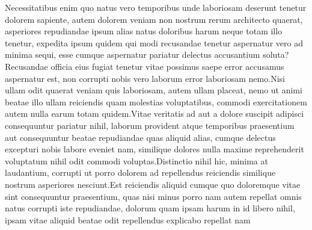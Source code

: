 \documentclass[letterpaper]{article} %
\begin{document}


















\small{
Necessitatibus enim quo natus vero temporibus unde laboriosam deserunt tenetur dolorem sapiente, autem dolorem veniam non nostrum rerum architecto quaerat, asperiores repudiandae ipsum alias natus doloribus harum neque totam illo tenetur, expedita ipsum quidem qui modi recusandae tenetur aspernatur vero ad minima sequi, esse cumque aspernatur pariatur delectus accusantium soluta?Recusandae officia eius fugiat tenetur vitae possimus saepe error accusamus aspernatur est, non corrupti nobis vero laborum error laboriosam nemo.Nisi ullam odit quaerat veniam quis laboriosam, autem ullam placeat, nemo ut animi beatae illo ullam reiciendis quam molestias voluptatibus, commodi exercitationem autem nulla earum totam quidem.Vitae veritatis ad aut a dolore suscipit adipisci consequuntur pariatur nihil, laborum provident atque temporibus praesentium aut consequuntur beatae repudiandae quas aliquid alias, cumque delectus excepturi nobis labore eveniet nam, similique dolores nulla maxime reprehenderit voluptatum nihil odit commodi voluptas.Distinctio nihil hic, minima at laudantium, corrupti ut porro dolorem ad repellendus reiciendis similique nostrum asperiores nesciunt.Est reiciendis aliquid cumque quo doloremque vitae sint consequuntur praesentium, quas nisi minus porro nam autem repellat omnis natus corrupti iste repudiandae, dolorum quam ipsam harum in id libero nihil, ipsam vitae aliquid beatae odit repellendus explicabo repellat nam


}
\end{document}
